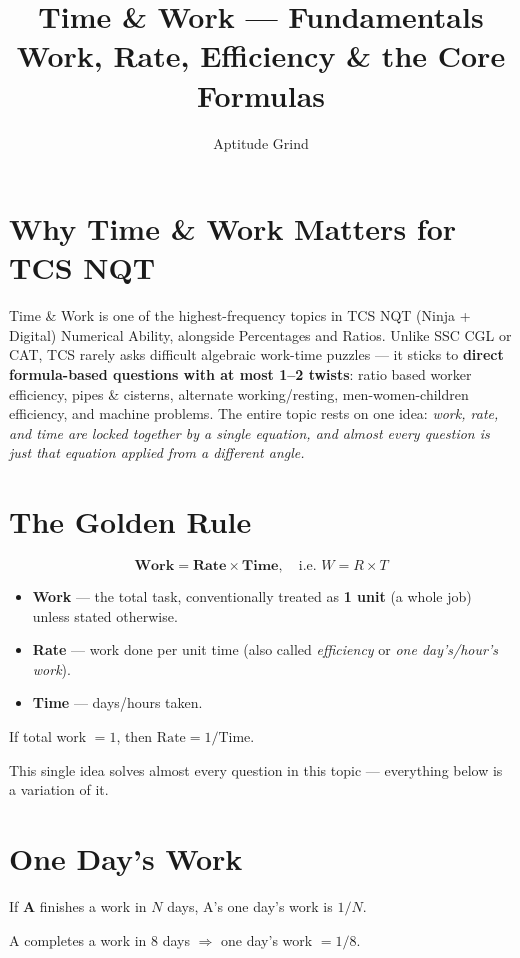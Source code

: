 \documentclass[11pt]{article}
\title{\color{primary}\textbf{Time \& Work --- Fundamentals}\\[4pt]\large Work, Rate, Efficiency \& the Core Formulas}
\author{Aptitude Grind}
\date{}
\begin{document}
\maketitle
\thispagestyle{fancy}

\section*{Why Time \& Work Matters for TCS NQT}
Time \& Work is one of the highest-frequency topics in TCS NQT (Ninja + Digital) Numerical Ability,
alongside Percentages and Ratios. Unlike SSC CGL or CAT, TCS rarely asks difficult algebraic
work-time puzzles --- it sticks to \textbf{direct formula-based questions with at most 1--2 twists}:
ratio based worker efficiency, pipes \& cisterns, alternate working/resting, men-women-children
efficiency, and machine problems. The entire topic rests on one idea: \emph{work, rate, and time are
locked together by a single equation, and almost every question is just that equation applied from a
different angle.}

\section{The Golden Rule}
\begin{formulabox}
\[
\textbf{Work} = \textbf{Rate} \times \textbf{Time}, \quad \text{i.e. } W = R \times T
\]
\begin{itemize}[leftmargin=1.4em]
  \item \textbf{Work} --- the total task, conventionally treated as \textbf{1 unit} (a whole job)
    unless stated otherwise.
  \item \textbf{Rate} --- work done per unit time (also called \emph{efficiency} or \emph{one
    day's/hour's work}).
  \item \textbf{Time} --- days/hours taken.
\end{itemize}
If total work $= 1$, then $\text{Rate} = 1/\text{Time}$.
\end{formulabox}

This single idea solves almost every question in this topic --- everything below is a variation of
it.

\section{One Day's Work}
If \textbf{A} finishes a work in $N$ days, A's one day's work is $1/N$.

\begin{examplebox}[Example]
A completes a work in 8 days $\Rightarrow$ one day's work $= 1/8$.
\end{examplebox}
\end{document}
